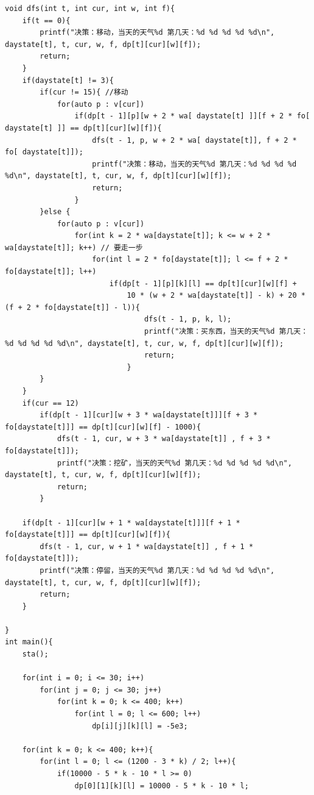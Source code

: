 \begin{verbatim}
void dfs(int t, int cur, int w, int f){
    if(t == 0){
        printf("决策：移动，当天的天气%d 第几天：%d %d %d %d %d\n", daystate[t], t, cur, w, f, dp[t][cur][w][f]);
        return;
    }
    if(daystate[t] != 3){
        if(cur != 15){ //移动
            for(auto p : v[cur])
                if(dp[t - 1][p][w + 2 * wa[ daystate[t] ]][f + 2 * fo[ daystate[t] ]] == dp[t][cur][w][f]){
                    dfs(t - 1, p, w + 2 * wa[ daystate[t]], f + 2 * fo[ daystate[t]]);
                    printf("决策：移动，当天的天气%d 第几天：%d %d %d %d %d\n", daystate[t], t, cur, w, f, dp[t][cur][w][f]);
                    return;
                }
        }else {
            for(auto p : v[cur])
                for(int k = 2 * wa[daystate[t]]; k <= w + 2 * wa[daystate[t]]; k++) // 要走一步
                    for(int l = 2 * fo[daystate[t]]; l <= f + 2 * fo[daystate[t]]; l++)
                        if(dp[t - 1][p][k][l] == dp[t][cur][w][f] + 
                            10 * (w + 2 * wa[daystate[t]] - k) + 20 * (f + 2 * fo[daystate[t]] - l)){
                                dfs(t - 1, p, k, l);
                                printf("决策：买东西，当天的天气%d 第几天：%d %d %d %d %d\n", daystate[t], t, cur, w, f, dp[t][cur][w][f]);
                                return;
                            }
        }
    }
    if(cur == 12)
        if(dp[t - 1][cur][w + 3 * wa[daystate[t]]][f + 3 * fo[daystate[t]]] == dp[t][cur][w][f] - 1000){
            dfs(t - 1, cur, w + 3 * wa[daystate[t]] , f + 3 * fo[daystate[t]]);
            printf("决策：挖矿，当天的天气%d 第几天：%d %d %d %d %d\n", daystate[t], t, cur, w, f, dp[t][cur][w][f]);
            return;
        }
    
    if(dp[t - 1][cur][w + 1 * wa[daystate[t]]][f + 1 * fo[daystate[t]]] == dp[t][cur][w][f]){
        dfs(t - 1, cur, w + 1 * wa[daystate[t]] , f + 1 * fo[daystate[t]]);
        printf("决策：停留，当天的天气%d 第几天：%d %d %d %d %d\n", daystate[t], t, cur, w, f, dp[t][cur][w][f]);
        return;
    }
    
}
int main(){
    sta();

    for(int i = 0; i <= 30; i++)
        for(int j = 0; j <= 30; j++)
            for(int k = 0; k <= 400; k++)
                for(int l = 0; l <= 600; l++)
                    dp[i][j][k][l] = -5e3;

    for(int k = 0; k <= 400; k++){
        for(int l = 0; l <= (1200 - 3 * k) / 2; l++){
            if(10000 - 5 * k - 10 * l >= 0)
                dp[0][1][k][l] = 10000 - 5 * k - 10 * l;
            

\end{verbatim}
